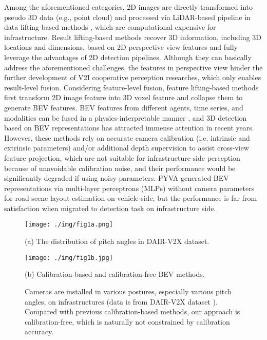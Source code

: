 \documentclass[letterpaper, 10 pt, conference]{ieeeconf}
\begin{document}
Among the aforementioned categories, 2D images are directly transformed into pseudo 3D data (e.g., point cloud) and processed via LiDAR-based pipeline in data lifting-based methods \cite{ma2019accurate, wang2019pseudo, weng2019monocular}, which are computational expensive for infrastructure. Result lifting-based methods \cite{zhang2022monodetr, monoflex, chen2020monopair, liu2020smoke,chen20153d} recover 3D information, including 3D locations and dimensions, based on 2D perspective view features and fully leverage the advantages of 2D detection pipelines. Although they can basically address the aforementioned challenges, the features in perspective view hinder the further development of V2I cooperative perception researches, which only enables result-level fusion. Considering feature-level fusion, feature lifting-based methods \cite{bevdet, bevdepth, bevformer, petr, imvoxelnet, reading2021categorical} first transform 2D image feature into 3D voxel feature and collapse them to generate BEV features. BEV features from different agents, time series, and modalities can be fused in a physics-interpretable manner \cite{bevsurvey}, and 3D detection based on BEV representations has attracted immense attention in recent years. However, these methods rely on accurate camera calibration (i.e. intrinsic and extrinsic parameters) and/or additional depth supervision to assist cross-view feature projection, which are not suitable for infrastructure-side perception because of unavoidable calibration noise, and their performance would be significantly degraded if using noisy parameters. PYVA \cite{pyva} generated BEV representations via multi-layer perceptrons (MLPs) without camera parameters for road scene layout estimation on vehicle-side, but the performance is far from satisfaction when migrated to detection task on infrastructure side.

\begin{figure}
\footnotesize
\begin{minipage}[b]{1.0\linewidth}
  \centering
  \centerline{\texttt{[image: ./img/fig1a.png]}}
  \centerline{(a) The distribution of pitch angles in DAIR-V2X dataset.}\medskip
\end{minipage}
 \vspace{10pt}
\begin{minipage}[b]{1.0\linewidth}
  \centering
  \centerline{\texttt{[image: ./img/fig1b.jpg]}}
  \centerline{(b) Calibration-based and calibration-free BEV methods.}\medskip
\end{minipage}

\caption{Cameras are installed in various postures, especially various pitch angles, on infrastructures (data is from DAIR-V2X dataset \cite{yu2022dair}). Compared with previous calibration-based methods, our approach is calibration-free, which is naturally not constrained by calibration accuracy. }
\label{fig:fig1}
\end{figure}
\end{document}

